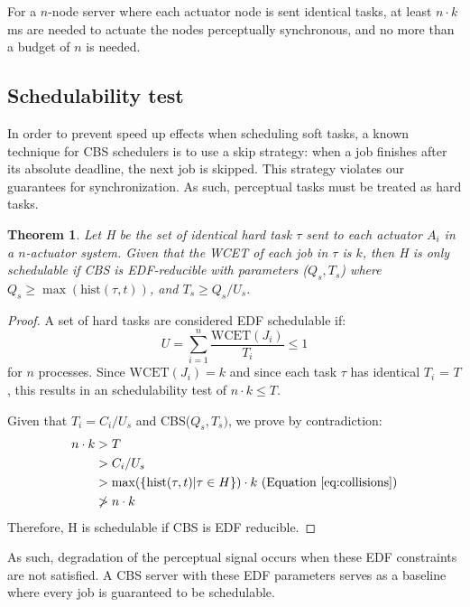 \documentclass{sigchi}
\newtheorem{theorem}{Theorem}
\begin{document}
  For a $n$-node server where each actuator node is sent identical tasks, at least $n \cdot k$ ms are needed to actuate the nodes perceptually synchronous, and no more than a budget of $n$ is needed.   

  \subsection{Schedulability test}
  In order to prevent speed up effects when scheduling soft tasks, a known technique for CBS schedulers is to use a skip strategy: when a job finishes after its absolute deadline, the next job is skipped. This strategy violates our guarantees for synchronization. As such, perceptual tasks must be treated as hard tasks. 

  \begin{theorem}
     Let H be the set of identical hard task $\tau$  sent to each actuator $A_i$ in a $n$-actuator system. Given that the WCET of each job in $\tau$ is $k$, then H is only schedulable if CBS is EDF-reducible with parameters ($Q_s, T_s$) where
     $Q_s \ge \max(\text{hist}(\tau, t))$, and $T_s \ge Q_s / U_s $. 
  \end{theorem}


  \begin{proof}
    A set of hard tasks are considered EDF schedulable \cite{xu_scheduling_1990} if: 
    \begin{equation}
      U = \sum_{i=1}^n \frac{\text{WCET}(J_i)}{T_i} \leq 1
    \end{equation}
    for $n$ processes. Since $\text{WCET}(J_i) = k$ and since each task $\tau$ has identical $T_i$ = $T$, this results in an schedulability test of $n \cdot k \leq T$.

    Given that $T_i = C_i / U_s$ \cite{abeni_integrating_1998} and CBS($Q_s, T_s)$, we prove by contradiction: 
    \begin{align*}
      n \cdot k &> T\\
           &> C_i / U_s \\
           &> \max(\{\text{hist}(\tau, t) \vert \tau \in H \}) \cdot k \text{ (Equation } \ref{eq:collisions})\\ 
           &\ngtr n \cdot k
    \end{align*}
    Therefore, H is schedulable if CBS is EDF reducible. 
  \end{proof}

  As such, degradation of the perceptual signal occurs when these EDF constraints are not satisfied. A CBS server with these EDF parameters serves as a baseline where every job is guaranteed to be schedulable. 
\end{document}
